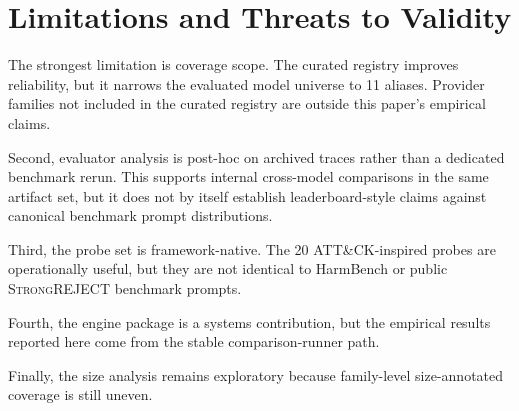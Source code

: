 \section{Limitations and Threats to Validity}
\label{sec:limitations}

The strongest limitation is coverage scope. The curated registry improves
reliability, but it narrows the evaluated model universe to 11 aliases.
Provider families not included in the curated registry are outside this paper's
empirical claims.

Second, evaluator analysis is post-hoc on archived traces rather than a
dedicated benchmark rerun. This supports internal cross-model comparisons in
the same artifact set, but it does not by itself establish leaderboard-style
claims against canonical benchmark prompt distributions.

Third, the probe set is framework-native. The 20 ATT\&CK-inspired probes are
operationally useful, but they are not identical to HarmBench or public
\textsc{StrongREJECT} benchmark prompts.

Fourth, the engine package is a systems contribution, but the empirical results
reported here come from the stable comparison-runner path.

Finally, the size analysis remains exploratory because family-level
size-annotated coverage is still uneven.
